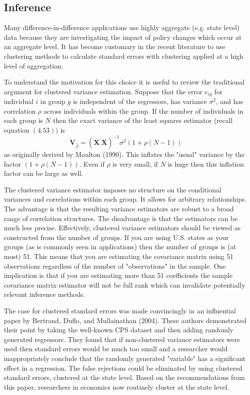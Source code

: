 \documentclass[10pt]{article}
\begin{document}
\subsection{Inference}
Many difference-in-difference applications use highly aggregate (e.g. state level) data because they are investigating the impact of policy changes which occur at an aggregate level. It has become customary in the recent literature to use clustering methods to calculate standard errors with clustering applied at a high level of aggregation.

To understand the motivation for this choice it is useful to review the traditional argument for clustered variance estimation. Suppose that the error $e_{i g}$ for individual $i$ in group $g$ is independent of the regressors, has variance $\sigma^{2}$, and has correlation $\rho$ across individuals within the group. If the number of individuals in each group is $N$ then the exact variance of the least squares estimator (recall equation $(4.53))$ is
$$
\boldsymbol{V}_{\widehat{\beta}}=\left(\boldsymbol{X}^{\prime} \boldsymbol{X}\right)^{-1} \sigma^{2}(1+\rho(N-1))
$$
as originally derived by Moulton (1990). This inflates the "usual" variance by the factor $(1+\rho(N-1))$. Even if $\rho$ is very small, if $N$ is huge then this inflation factor can be large as well.

The clustered variance estimator imposes no structure on the conditional variances and correlations within each group. It allows for arbitrary relationships. The advantage is that the resulting variance estimators are robust to a broad range of correlation structures. The disadvantage is that the estimators can be much less precise. Effectively, clustered variance estimators should be viewed as constructed from the number of groups. If you are using U.S. states as your groups (as is commonly seen in applications) then the number of groups is (at most) 51. This means that you are estimating the covariance matrix using 51 observations regardless of the number of "observations" in the sample. One implication is that if you are estimating more than 51 coefficients the sample covariance matrix estimator will not be full rank which can invalidate potentially relevant inference methods.

The case for clustered standard errors was made convincingly in an influential paper by Bertrand, Duflo, and Mullainathan (2004). These authors demonstrated their point by taking the well-known CPS dataset and then adding randomly generated regressors. They found that if non-clustered variance estimators were used then standard errors would be much too small and a researcher would inappropriately conclude that the randomly generated "variable" has a significant effect in a regression. The false rejections could be eliminated by using clustered standard errors, clustered at the state level. Based on the recommendations from this paper, researchers in economics now routinely cluster at the state level.
\end{document}
